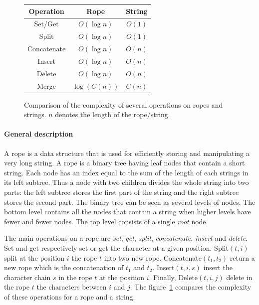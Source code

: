 \documentclass{article}
\renewcommand{\-}{\hyp}
\begin{document}
\begin{figure}
\centering
\setlength{\tabcolsep}{1cm}
\begin{tabular}{|c|c|c|}
\hline
	Operation &
	Rope &
	String \\
\hline
	Set/Get &
	\cellcolor{butter!20} $O(\log n)$ &
	\cellcolor{chameleon!20} $O(1)$ \\
\hline
	Split &
	\cellcolor{butter!20} $O(\log n)$ &
	\cellcolor{chameleon!20} $O(1)$ \\
\hline
	Concatenate &
	\cellcolor{butter!20} $O(\log n)$ &
	\cellcolor{scarletred!20} $O(n)$ \\
\hline
	Insert &
	\cellcolor{butter!20} $O(\log n)$ &
	\cellcolor{scarletred!20} $O(n)$ \\
\hline
	Delete &
	\cellcolor{butter!20} $O(\log n)$ &
	\cellcolor{scarletred!20} $O(n)$ \\
\hline
\hline
	Merge &
	\cellcolor{chameleon!20} $\log\left(C(n)\right)$ &
	\cellcolor{butter!20} $C(n)$ \\
\hline
\end{tabular}
\caption{Comparison of the complexity of several operations on ropes and strings. $n$ denotes the length of the rope/string.}
\label{complexity}
\end{figure}

\paragraph{General description}
A rope is a data structure that is used for efficiently storing and manipulating a very long string.
A rope is a binary tree having leaf nodes that contain a short string.
Each node has an index equal to the sum of the length of each strings in its left subtree.
Thus a node with two children divides the whole string into two parts: the left subtree stores the first part of the string and the right subtree stores the second part.
The binary tree can be seen as several levels of nodes.
The bottom level contains all the nodes that contain a string when higher levels have fewer and fewer nodes.
The top level consists of a single \emph{root} node.

The main operations on a rope are \emph{set}, \emph{get}, \emph{split}, \emph{concatenate}, \emph{insert} and \emph{delete}. Set and get respectively set or get the character at a given position. Split$(t, i)$ split at the position $i$ the rope $t$ into two new rope. Concatenate$(t_1, t_2)$ return a new rope which is the concatenation of $t_1$ and $t_2$. Insert$(t, i, s)$ insert the character chain $s$ in the rope $t$ at the position $i$. Finally, Delete$(t, i, j)$ delete in the rope $t$ the characters between $i$ and $j$. The figure~\ref{complexity} compares the complexity of these operations for a rope and a string.
\end{document}
